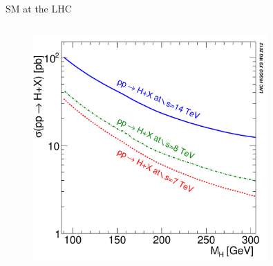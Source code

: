 \begin{frame}{SM at the LHC}
\begin{columns}
\begin{column}{.50\textwidth}
\vspace{-.2cm}
\begin{figure}[!Hhtbp]
  \begin{center}
    \includegraphics[width=0.8\textwidth]{../figs/totalXS_LM.png}
  \end{center}
\end{figure}

\end{column}
\end{columns}

\end{frame}

\fi
